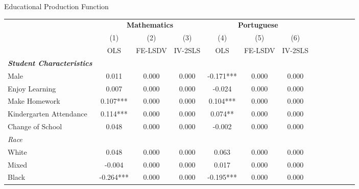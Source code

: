\documentclass{beamer}
\begin{document}
\begin{frame}[label=EPF]{Educational Production Function}
\vspace{-27pt} \flushright \hyperlink{Mirror}{\beamerbutton{\textcolor{red}{Mirror}}}
\vspace{-7pt}
\begin{table}
\begin{adjustbox}{max width=\textwidth} 
\begin{tabular}{l*{6}{cc}}
\toprule
& \multicolumn{3}{c}{\textbf{Mathematics}} &                      \multicolumn{3}{c}{\textbf{Portuguese}} \\            \cline{2-4}              \cline{5-7}                    
                    &\multicolumn{1}{c}{(1)}   &\multicolumn{1}{c}{(2)}   &\multicolumn{1}{c}{(3)}   &\multicolumn{1}{c}{(4)}   &\multicolumn{1}{c}{(5)}   &\multicolumn{1}{c}{(6)}   \\
                    &         OLS   &     FE-LSDV   &     IV-2SLS   &         OLS   &     FE-LSDV   &     IV-2SLS   \\
\midrule
\textbf{\emph{Student Characteristics}}&               &               &               &               &               &               \\
Male                &       0.011   &       0.000   &       0.000   &      -0.171***&       0.000   &       0.000   \\
Enjoy Learning      &       0.007   &       0.000   &       0.000   &      -0.024   &       0.000   &       0.000   \\
Make Homework       &       0.107***&       0.000   &       0.000   &       0.104***&       0.000   &       0.000   \\
Kindergarten Attendance&       0.114***&       0.000   &       0.000   &       0.074** &       0.000   &       0.000   \\
Change of School    &       0.048   &       0.000   &       0.000   &      -0.002   &       0.000   &       0.000   \\
\emph{Race}         &               &               &               &               &               &               \\
White               &       0.048   &       0.000   &       0.000   &       0.063   &       0.000   &       0.000   \\
Mixed               &      -0.004   &       0.000   &       0.000   &       0.017   &       0.000   &       0.000   \\
Black               &      -0.264***&       0.000   &       0.000   &      -0.195***&       0.000   &       0.000   \\

\end{tabular}
\end{adjustbox}
\end{table}
\end{frame}
\end{document}
